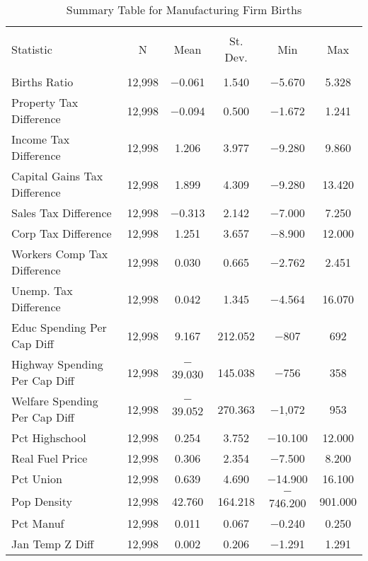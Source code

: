 
\begin{table}[!htbp] \centering 
  \caption{Summary Table for  Manufacturing Firm Births} 
  \label{31-33summary} 
\begin{tabular}{@{\extracolsep{5pt}}lccccc} 
\\[-1.8ex]\hline 
\hline \\[-1.8ex] 
Statistic & \multicolumn{1}{c}{N} & \multicolumn{1}{c}{Mean} & \multicolumn{1}{c}{St. Dev.} & \multicolumn{1}{c}{Min} & \multicolumn{1}{c}{Max} \\ 
\hline \\[-1.8ex] 
Births Ratio & 12,998 & $-$0.061 & 1.540 & $-$5.670 & 5.328 \\ 
Property Tax Difference & 12,998 & $-$0.094 & 0.500 & $-$1.672 & 1.241 \\ 
Income Tax Difference & 12,998 & 1.206 & 3.977 & $-$9.280 & 9.860 \\ 
Capital Gains Tax Difference & 12,998 & 1.899 & 4.309 & $-$9.280 & 13.420 \\ 
Sales Tax Difference & 12,998 & $-$0.313 & 2.142 & $-$7.000 & 7.250 \\ 
Corp Tax Difference & 12,998 & 1.251 & 3.657 & $-$8.900 & 12.000 \\ 
Workers Comp Tax Difference & 12,998 & 0.030 & 0.665 & $-$2.762 & 2.451 \\ 
Unemp. Tax Difference & 12,998 & 0.042 & 1.345 & $-$4.564 & 16.070 \\ 
Educ Spending Per Cap Diff & 12,998 & 9.167 & 212.052 & $-$807 & 692 \\ 
Highway Spending Per Cap Diff & 12,998 & $-$39.030 & 145.038 & $-$756 & 358 \\ 
Welfare Spending Per Cap Diff & 12,998 & $-$39.052 & 270.363 & $-$1,072 & 953 \\ 
Pct Highschool & 12,998 & 0.254 & 3.752 & $-$10.100 & 12.000 \\ 
Real Fuel Price & 12,998 & 0.306 & 2.354 & $-$7.500 & 8.200 \\ 
Pct Union & 12,998 & 0.639 & 4.690 & $-$14.900 & 16.100 \\ 
Pop Density & 12,998 & 42.760 & 164.218 & $-$746.200 & 901.000 \\ 
Pct Manuf & 12,998 & 0.011 & 0.067 & $-$0.240 & 0.250 \\ 
Jan Temp Z Diff & 12,998 & 0.002 & 0.206 & $-$1.291 & 1.291 \\ 

\end{tabular}
\end{table}
